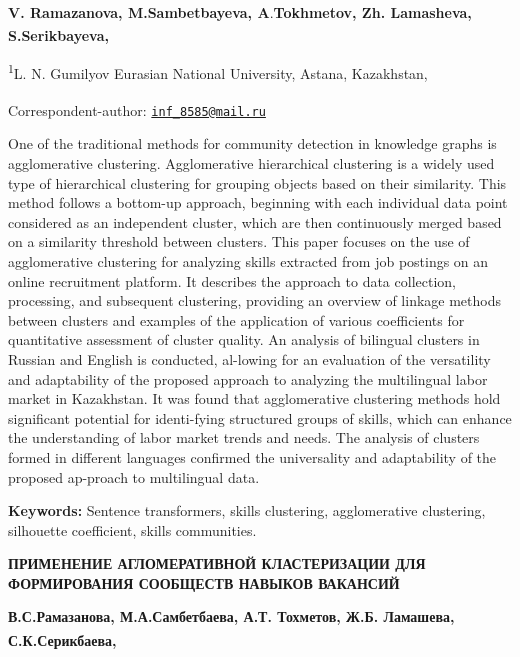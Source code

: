 
\begin{articleheader}

{\bfseries V. Ramazanova, M.Sambetbayeva, A}.{\bfseries Tokhmetov, Zh.
Lamasheva, S.Serikbayeva\textsuperscript{\envelope },}
\end{articleheader}

\begin{affiliation}
\textsuperscript{1}L. N. Gumilyov Eurasian National University, Astana,
Kazakhstan,

{\bfseries \textsuperscript{\envelope }}Correspondent-author: \href{mailto:inf_8585@mail.ru}{\nolinkurl{inf\_8585@mail.ru}}
\end{affiliation}

One of the traditional methods for community detection in knowledge
graphs is agglomerative clustering. Agglomerative hierarchical
clustering is a widely used type of hierarchical clustering for grouping
objects based on their similarity. This method follows a bottom-up
approach, beginning with each individual data point considered as an
independent cluster, which are then continuously merged based on a
similarity threshold between clusters. This paper focuses on the use of
agglomerative clustering for analyzing skills extracted from job
postings on an online recruitment platform. It describes the approach to
data collection, processing, and subsequent clustering, providing an
overview of linkage methods between clusters and examples of the
application of various coefficients for quantitative assessment of
cluster quality. An analysis of bilingual clusters in Russian and
English is conducted, al-lowing for an evaluation of the versatility and
adaptability of the proposed approach to analyzing the multilingual
labor market in Kazakhstan. It was found that agglomerative clustering
methods hold significant potential for identi-fying structured groups of
skills, which can enhance the understanding of labor market trends and
needs. The analysis of clusters formed in different languages confirmed
the universality and adaptability of the proposed ap-proach to
multilingual data.

{\bfseries Keywords:} Sentence transformers, skills clustering,
agglomerative clustering, silhouette coefficient, skills communities.

\begin{articleheader}
{\bfseries ПРИМЕНЕНИЕ АГЛОМЕРАТИВНОЙ КЛАСТЕРИЗАЦИИ ДЛЯ ФОРМИРОВАНИЯ
СООБЩЕСТВ НАВЫКОВ ВАКАНСИЙ}

{\bfseries В.С.Рамазанова, М.А.Самбетбаева, А.Т. Тохметов, Ж.Б. Ламашева,
С.К.Серикбаева\textsuperscript{\envelope },}
\end{articleheader}


